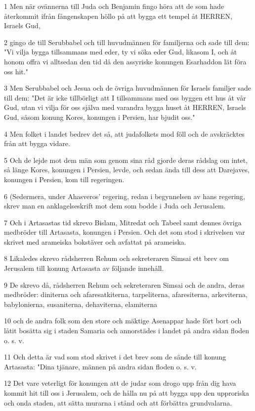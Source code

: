 \par 1 Men när ovännerna till Juda och Benjamin fingo höra att de som hade återkommit ifrån fångenskapen höllo på att bygga ett tempel åt HERREN, Israels Gud,
\par 2 gingo de till Serubbabel och till huvudmännen för familjerna och sade till dem: "Vi vilja bygga tillsammans med eder, ty vi söka eder Gud, likasom I, och åt honom offra vi alltsedan den tid då den assyriske konungen Esarhaddon lät föra oss hit."
\par 3 Men Serubbabel och Jesua och de övriga huvudmännen för Israels familjer sade till dem: "Det är icke tillbörligt att I tillsammans med oss byggen ett hus åt vår Gud, utan vi vilja för oss själva med varandra bygga huset åt HERREN, Israels Gud, såsom konung Kores, konungen i Persien, har bjudit oss."
\par 4 Men folket i landet bedrev det så, att judafolkets mod föll och de avskräcktes från att bygga vidare.
\par 5 Och de lejde mot dem män som genom sina råd gjorde deras rådslag om intet, så länge Kores, konungen i Persien, levde, och sedan ända till dess att Darejaves, konungen i Persien, kom till regeringen.
\par 6 (Sedermera, under Ahasveros' regering, redan i begynnelsen av hans regering, skrev man en anklagelseskrift mot dem som bodde i Juda och Jerusalem.
\par 7 Och i Artasastas tid skrevo Bislam, Mitredat och Tabeel samt dennes övriga medbröder till Artasasta, konungen i Persien. Och det som stod i skrivelsen var skrivet med arameiska bokstäver och avfattat på arameiska.
\par 8 Likaledes skrevo rådsherren Rehum och sekreteraren Simsai ett brev om Jerusalem till konung Artasasta av följande innehåll.
\par 9 De skrevo då, rådsherren Rehum och sekreteraren Simsai och de andra, deras medbröder: diniterna och afaresatkiterna, tarpeliterna, afaresiterna, arkeviterna, babylonierna, susaniterna, dehaviterna, elamiterna
\par 10 och de andra folk som den store och mäktige Asenappar hade fört bort och låtit bosätta sig i staden Samaria och annorstädes i landet på andra sidan floden o. s. v.
\par 11 Och detta är vad som stod skrivet i det brev som de sände till konung Artasasta: "Dina tjänare, männen på andra sidan floden o. s. v.
\par 12 Det vare veterligt för konungen att de judar som drogo upp från dig hava kommit hit till oss i Jerusalem, och de hålla nu på att bygga upp den upproriska och onda staden, att sätta murarna i stånd och att förbättra grundvalarna.
